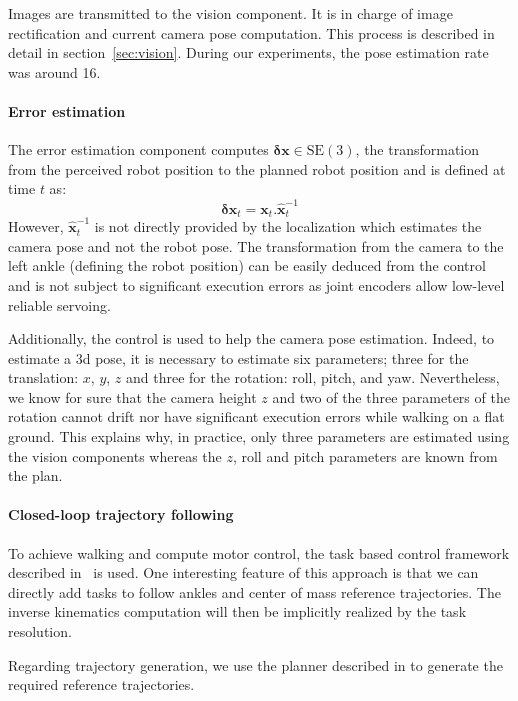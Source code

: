 Images are transmitted to the vision component. It is in charge of
image rectification and current camera pose computation. This process
is described in detail in section~\ref{sec:vision}.  During our
experiments, the pose estimation rate was around 16\hertz.


\paragraph{Error estimation}

The error estimation component computes $\mathbf{\delta x} \in
\text{SE}(3)$, the transformation from the perceived robot position to
the planned robot position and is defined at time $t$ as:
%
\begin{equation} \label{eq:errorpos}
  \mathbf{\delta x}_t = \mathbf{x}_t . \hat{\mathbf{x}}_t^{-1}
\end{equation}
%
However, $\hat{\mathbf{x}}_t^{-1}$ is not directly provided by the
localization which estimates the camera pose and not the robot
pose. The transformation from the camera to the left ankle (defining
the robot position) can be easily deduced from the control and is not
subject to significant execution errors as joint encoders allow
low-level reliable servoing.

Additionally, the control is used to help the camera pose
estimation. Indeed, to estimate a 3d pose, it is necessary to estimate
six parameters; three for the translation: $x$, $y$, $z$ and three for
the rotation: roll, pitch, and yaw. Nevertheless, we know for sure
that the camera height $z$ and two of the three parameters of the
rotation cannot drift nor have significant execution errors while
walking on a flat ground. This explains why, in practice, only three
parameters are estimated using the vision components whereas the $z$,
roll and pitch parameters are known from the plan.

\paragraph{Closed-loop trajectory following}

To achieve walking and compute motor control, the task based control
framework described in~\cite{Mansard09icar} is used. One interesting
feature of this approach is that we can directly add tasks to follow
ankles and center of mass reference trajectories. The inverse
kinematics computation will then be implicitly realized by the task
resolution.

Regarding trajectory generation, we use the planner described in
\cite{Dalibard11humanoids} to generate the required reference
trajectories.

